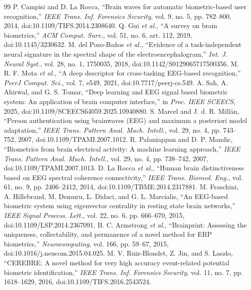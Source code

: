 \documentclass[conference]{IEEEtran}
\begin{document}
\FloatBarrier
\begin{thebibliography}{99}
 P. Campisi and D. La Rocca, ``Brain waves for automatic biometric-based user recognition,'' \emph{IEEE Trans. Inf. Forensics Security}, vol. 9, no. 5, pp. 782--800, 2014, doi:10.1109/TIFS.2014.2308640.
 Q. Gui \emph{et al.}, ``A survey on brain biometrics,'' \emph{ACM Comput. Surv.}, vol. 51, no. 6, art. 112, 2019, doi:10.1145/3230632.
 M. del Pozo-Ba\~nos \emph{et al.}, ``Evidence of a task-independent neural signature in the spectral shape of the electroencephalogram,'' \emph{Int. J. Neural Syst.}, vol. 28, no. 1, 1750035, 2018, doi:10.1142/S0129065717500356.
 M. R. F. Mota \emph{et al.}, ``A deep descriptor for cross-tasking EEG-based recognition,'' \emph{PeerJ Comput. Sci.}, vol. 7, e549, 2021, doi:10.7717/peerj-cs.549.
 A. Sah, A. Ahirwal, and G. S. Tomar, ``Deep learning and EEG signal based biometric system: An application of brain computer interface,'' in \emph{Proc. IEEE SCEECS}, 2025, doi:10.1109/SCEECS64059.2025.10940880.
 S. Marcel and J. d. R. Mill\'an, ``Person authentication using brainwaves (EEG) and maximum a posteriori model adaptation,'' \emph{IEEE Trans. Pattern Anal. Mach. Intell.}, vol. 29, no. 4, pp. 743--752, 2007, doi:10.1109/TPAMI.2007.1012.
 R. Palaniappan and D. P. Mandic, ``Biometrics from brain electrical activity: A machine learning approach,'' \emph{IEEE Trans. Pattern Anal. Mach. Intell.}, vol. 29, no. 4, pp. 738--742, 2007, doi:10.1109/TPAMI.2007.1013.
 D. La Rocca \emph{et al.}, ``Human brain distinctiveness based on EEG spectral coherence connectivity,'' \emph{IEEE Trans. Biomed. Eng.}, vol. 61, no. 9, pp. 2406--2412, 2014, doi:10.1109/TBME.2014.2317881.
 M. Fraschini, A. Hillebrand, M. Demuru, L. Didaci, and G. L. Marcialis, ``An EEG-based biometric system using eigenvector centrality in resting state brain networks,'' \emph{IEEE Signal Process. Lett.}, vol. 22, no. 6, pp. 666--670, 2015, doi:10.1109/LSP.2014.2367091.
 B. C. Armstrong \emph{et al.}, ``Brainprint: Assessing the uniqueness, collectability, and permanence of a novel method for ERP biometrics,'' \emph{Neurocomputing}, vol. 166, pp. 59--67, 2015, doi:10.1016/j.neucom.2015.04.025.
 M. V. Ruiz-Blondet, Z. Jin, and S. Laszlo, ``CEREBRE: A novel method for very high accuracy event-related potential biometric identification,'' \emph{IEEE Trans. Inf. Forensics Security}, vol. 11, no. 7, pp. 1618--1629, 2016, doi:10.1109/TIFS.2016.2543524.

\end{thebibliography}
\end{document}
